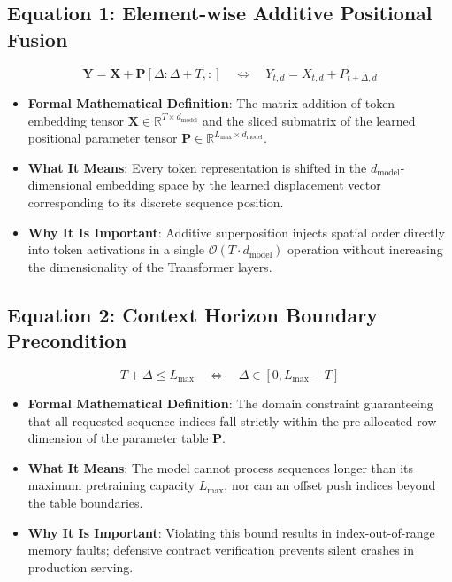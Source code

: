 \documentclass[11pt,a4paper]{article}
\theoremstyle{definition}
\begin{document}
\subsection{\textbf{Equation 1: Element-wise Additive Positional Fusion}}
{\boldmath
\begin{equation}
\mathbf{Y} = \mathbf{X} + \mathbf{P}[\Delta : \Delta + T, :] \quad \Longleftrightarrow \quad Y_{t, d} = X_{t, d} + P_{t + \Delta, d}
\end{equation}
}
\begin{itemize}
    \item \textbf{Formal Mathematical Definition}:
    The matrix addition of token embedding tensor $\mathbf{X} \in \mathbb{R}^{T \times d_{\text{model}}}$ and the sliced submatrix of the learned positional parameter tensor $\mathbf{P} \in \mathbb{R}^{L_{\text{max}} \times d_{\text{model}}}$.
    \item \textbf{What It Means}:
    Every token representation is shifted in the $d_{\text{model}}$-dimensional embedding space by the learned displacement vector corresponding to its discrete sequence position.
    \item \textbf{Why It Is Important}:
    Additive superposition injects spatial order directly into token activations in a single $\mathcal{O}(T \cdot d_{\text{model}})$ operation without increasing the dimensionality of the Transformer layers.
\end{itemize}

\subsection{\textbf{Equation 2: Context Horizon Boundary Precondition}}
{\boldmath
\begin{equation}
T + \Delta \le L_{\text{max}} \quad \Longleftrightarrow \quad \Delta \in [0, L_{\text{max}} - T]
\end{equation}
}
\begin{itemize}
    \item \textbf{Formal Mathematical Definition}:
    The domain constraint guaranteeing that all requested sequence indices fall strictly within the pre-allocated row dimension of the parameter table $\mathbf{P}$.
    \item \textbf{What It Means}:
    The model cannot process sequences longer than its maximum pretraining capacity $L_{\text{max}}$, nor can an offset push indices beyond the table boundaries.
    \item \textbf{Why It Is Important}:
    Violating this bound results in index-out-of-range memory faults; defensive contract verification prevents silent crashes in production serving.
\end{itemize}
\end{document}
